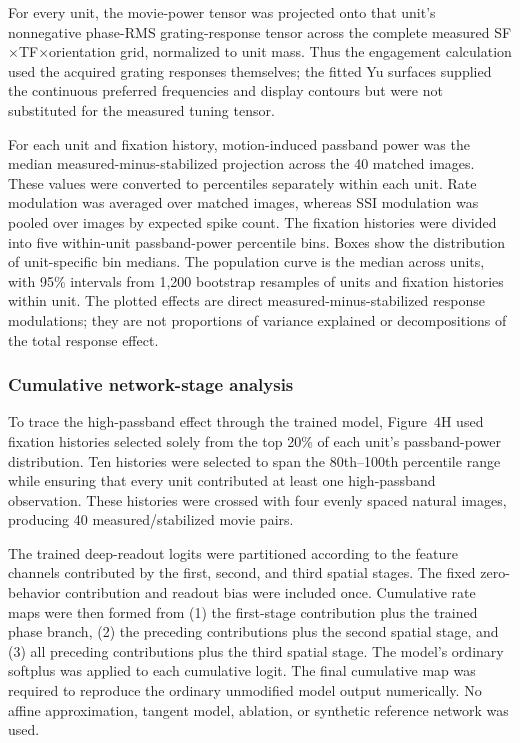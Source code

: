 \documentclass{lite}
\begin{document}
For every unit, the movie-power tensor was projected onto that unit's nonnegative phase-RMS grating-response tensor across the complete measured SF$\times$TF$\times$orientation grid, normalized to unit mass. Thus the engagement calculation used the acquired grating responses themselves; the fitted Yu surfaces supplied the continuous preferred frequencies and display contours but were not substituted for the measured tuning tensor.

For each unit and fixation history, motion-induced passband power was the median measured-minus-stabilized projection across the 40 matched images. These values were converted to percentiles separately within each unit. Rate modulation was averaged over matched images, whereas SSI modulation was pooled over images by expected spike count. The fixation histories were divided into five within-unit passband-power percentile bins. Boxes show the distribution of unit-specific bin medians. The population curve is the median across units, with 95\% intervals from 1{,}200 bootstrap resamples of units and fixation histories within unit. The plotted effects are direct measured-minus-stabilized response modulations; they are not proportions of variance explained or decompositions of the total response effect.

\subsubsection{Cumulative network-stage analysis}

To trace the high-passband effect through the trained model, Figure~4H used fixation histories selected solely from the top 20\% of each unit's passband-power distribution. Ten histories were selected to span the 80th--100th percentile range while ensuring that every unit contributed at least one high-passband observation. These histories were crossed with four evenly spaced natural images, producing 40 measured/stabilized movie pairs.

The trained deep-readout logits were partitioned according to the feature channels contributed by the first, second, and third spatial stages. The fixed zero-behavior contribution and readout bias were included once. Cumulative rate maps were then formed from (1) the first-stage contribution plus the trained phase branch, (2) the preceding contributions plus the second spatial stage, and (3) all preceding contributions plus the third spatial stage. The model's ordinary softplus was applied to each cumulative logit. The final cumulative map was required to reproduce the ordinary unmodified model output numerically. No affine approximation, tangent model, ablation, or synthetic reference network was used.
\end{document}
